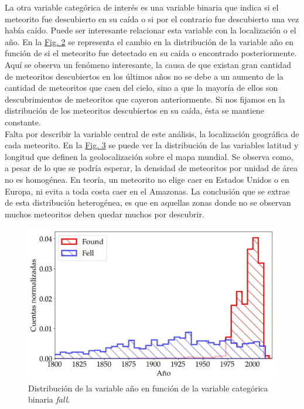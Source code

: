 \documentclass[12pt]{article}
\begin{document}
    La otra variable categórica de interés es una variable binaria que indica si el meteorito fue descubierto en su caída o si por el contrario fue descubierto una vez había caído. Puede ser interesante relacionar esta variable con la localización o el año. En la \hyperref[Fig:year_fall]{Fig. 2} se representa el cambio en la distribución de la variable año en función de si el meteorito fue detectado en su caída o encontrado posteriormente. Aquí se observa un fenómeno interesante, la causa de que existan gran cantidad de meteoritos descubiertos en los últimos años no se debe a un aumento de la cantidad de meteoritos que caen del cielo, sino a que la mayoría de ellos son descubrimientos de meteoritos que cayeron anteriormente. Si nos fijamos en la distribución de los meteoritos descubiertos en su caída, ésta se mantiene constante.\\
    Falta por describir la variable central de este análisis, la localización geográfica de cada meteorito. En la \hyperref[Fig:geolocation]{Fig. 3} se puede ver la distribución de las variables latitud y longitud que definen la geolocalización sobre el mapa mundial. Se observa como, a pesar de lo que se podría esperar, la densidad de meteoritos por unidad de área no es homogénea. En teoría, un meteorito no elige caer en Estados Unidos o en Europa, ni evita a toda costa caer en el Amazonas. La conclusión que se extrae de esta distribución heterogénea, es que en aquellas zonas donde no se observan muchos meteoritos deben quedar muchos por descubrir.
    \begin{figure}[t]
    	\centering
    	\label{Fig:year_fall}
    	\includegraphics[scale = 0.55]{year_vs_fall}
    	\caption{Distribución de la variable año en función de la variable categórica binaria \textit{fall}.}
    \end{figure}
\end{document}

